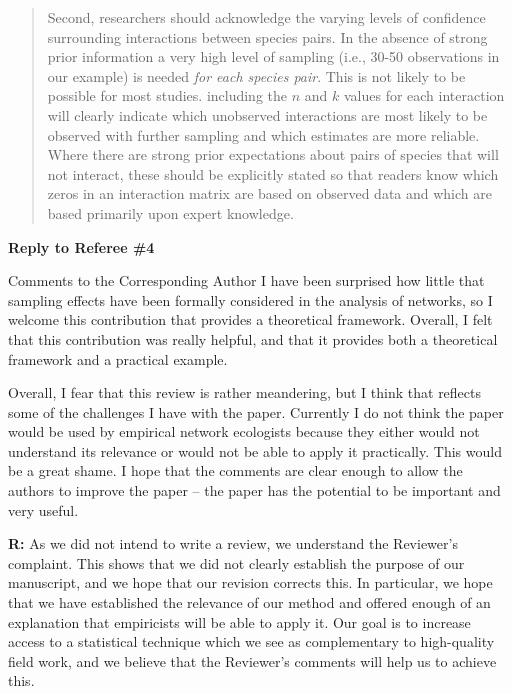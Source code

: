 \documentclass[12pt]{letter}
\newenvironment{refquote}{\bigskip \begin{it}}{\end{it}\smallskip}
\begin{document}
		\begin{quotation}

			Second, researchers should acknowledge the varying levels of confidence surrounding interactions between species pairs. In the absence of strong prior information a very high level of sampling (i.e., 30-50 observations in our example) is needed \emph{for each species pair}. This is not likely to be possible for most studies. including the $n$ and $k$ values for each interaction will clearly indicate which unobserved interactions are most likely to be observed with further sampling and which estimates are more reliable. Where there are strong prior expectations about pairs of species that will not interact, these should be explicitly stated so that readers know which zeros in an interaction matrix are based on observed data and which are based primarily upon expert knowledge.

		\end{quotation}


\clearpage

{\Large \bf Reply to Referee \#4}

	\begin{refquote}
		Comments to the Corresponding Author
		I have been surprised how little that sampling effects have been formally considered in the analysis of networks, so I welcome this contribution that provides a theoretical framework. Overall, I felt that this contribution was really helpful, and that it provides both a theoretical framework and a practical example.

		Overall, I fear that this review is rather meandering, but I think that reflects some of the challenges I have with the paper. Currently I do not think the paper would be used by empirical network ecologists because they either would not understand its relevance or would not be able to apply it practically. This would be a great shame. I hope that the comments are clear enough to allow the authors to improve the paper – the paper has the potential to be important and very useful.
		\end{refquote}

		\textbf{R:} As we did not intend to write a review, we understand the Reviewer's complaint. This shows that we did not clearly establish the purpose of our manuscript, and we hope that our revision corrects this. In particular, we hope that we have established the relevance of our method and offered enough of an explanation that empiricists will be able to apply it. Our goal is to increase access to a statistical technique which we see as complementary to high-quality field work, and we believe that the Reviewer's comments will help us to achieve this.
\end{document}
